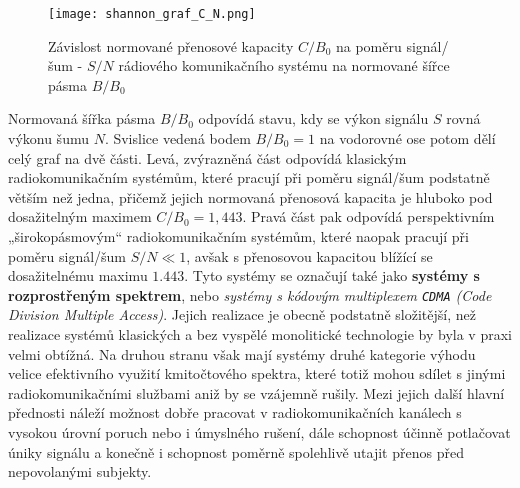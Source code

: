       \begin{figure}[ht!]  %
        \centering
        \texttt{[image: shannon\_graf\_C\_N.png]}
        \caption{Závislost normované přenosové kapacity \(C/B_0\) na poměru signál/šum - \(S/N\)  
                 rádiového komunikačního systému na normované šířce pásma \(B/B_0\)
                  \cite[s.~79]{ZaludRA}}
        \label{fig_RA:modulace02}
      \end{figure} 
      
      Normovaná šířka pásma \(B/B_0\) odpovídá stavu, kdy se výkon signálu \(S\) rovná výkonu šumu 
      \(N\). Svislice vedená bodem \(B/B_0 = 1\) na vodorovné ose potom dělí celý graf na dvě 
      části. Levá, zvýrazněná část odpovídá klasickým radiokomunikačním systémům, které pracují při 
      poměru signál/šum podstatně větším než jedna, přičemž jejich normovaná přenosová kapacita je 
      hluboko pod dosažitelným maximem \(C/B_0 = 1,443\). Pravá část pak odpovídá perspektivním 
      „širokopásmovým“ radiokomunikačním systémům, které naopak pracují při poměru signál/šum \(
      S/N\ll1\), avšak s přenosovou kapacitou blížící se dosažitelnému maximu \(\num{1.443}\). Tyto 
      systémy se označují také jako \textbf{systémy s rozprostřeným spektrem}, nebo \emph{systémy s 
      kódovým multiplexem \texttt{CDMA} (Code Division Multiple Access)}. Jejich realizace je 
      obecně podstatně složitější, než realizace systémů klasických a bez vyspělé monolitické 
      technologie by byla v praxi velmi obtížná. Na druhou stranu však mají systémy druhé kategorie 
      výhodu velice efektivního využití kmitočtového spektra, které totiž mohou sdílet s jinými 
      radiokomunikačními službami aniž by se vzájemně rušily. Mezi jejich další hlavní přednosti 
      náleží možnost dobře pracovat v radiokomunikačních kanálech s vysokou úrovní poruch nebo i 
      úmyslného rušení, dále schopnost účinně potlačovat úniky signálu a konečně i schopnost 
      poměrně spolehlivě utajit přenos před nepovolanými subjekty.\cite[s.~78]{ZaludRA}
     
      
